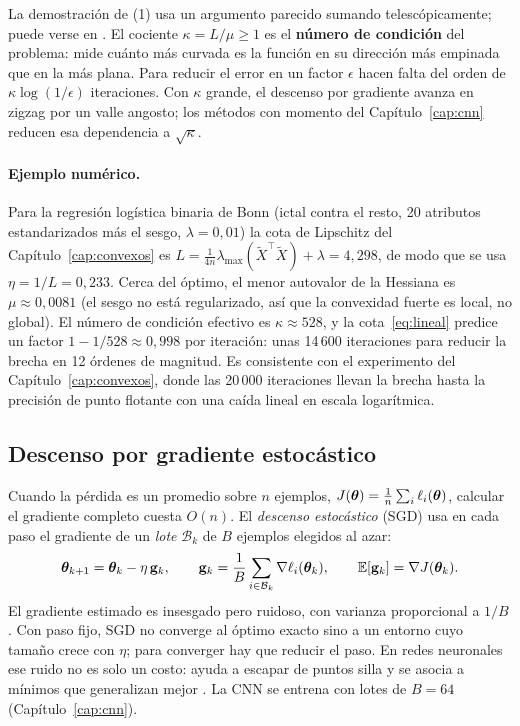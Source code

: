 La demostración de (1) usa un argumento parecido sumando telescópicamente; puede verse en
\textcite[Sec.~9.3]{boyd2004}. El cociente $\kappa = L/\mu \ge 1$ es el \textbf{número de condición} del
problema: mide cuánto más curvada es la función en su dirección más empinada que en la más plana. Para
reducir el error en un factor $\epsilon$ hacen falta del orden de $\kappa\log(1/\epsilon)$ iteraciones. Con
$\kappa$ grande, el descenso por gradiente avanza en zigzag por un valle angosto; los métodos con momento
del Capítulo~\ref{cap:cnn} reducen esa dependencia a $\sqrt\kappa$.

\paragraph{Ejemplo numérico.} Para la regresión logística binaria de Bonn (ictal contra el resto, 20 atributos
estandarizados más el sesgo, $\lambda = 0{,}01$) la cota de Lipschitz del Capítulo~\ref{cap:convexos} es
$L = \tfrac{1}{4n}\lambda_{\max}(\tilde X^\top\tilde X) + \lambda = 4{,}298$, de modo que se usa
$\eta = 1/L = 0{,}233$. Cerca del óptimo, el menor autovalor de la Hessiana es $\mu \approx 0{,}0081$
(el sesgo no está regularizado, así que la convexidad fuerte es local, no global). El número de condición
efectivo es $\kappa \approx 528$, y la cota~\eqref{eq:lineal} predice un factor $1 - 1/528 \approx 0{,}998$
por iteración: unas 14\,600 iteraciones para reducir la brecha en 12 órdenes de magnitud. Es consistente con
el experimento del Capítulo~\ref{cap:convexos}, donde las 20\,000 iteraciones llevan la brecha hasta la
precisión de punto flotante con una caída lineal en escala logarítmica.

\subsection{Descenso por gradiente estocástico}

Cuando la pérdida es un promedio sobre $n$ ejemplos, $J(\boldsymbol{\theta}) = \frac1n\sum_i \ell_i(\boldsymbol{\theta})$, calcular el gradiente
completo cuesta $O(n)$. El \emph{descenso estocástico} (SGD) usa en cada paso el gradiente de un \emph{lote}
$\mathcal{B}_k$ de $B$ ejemplos elegidos al azar:
\begin{equation}
  \boldsymbol{\theta}_{k+1} = \boldsymbol{\theta}_k - \eta\,\mathbf{g}_k, \qquad
  \mathbf{g}_k = \frac{1}{B}\sum_{i \in \mathcal{B}_k}\nabla\ell_i(\boldsymbol{\theta}_k), \qquad \mathbb{E}[\mathbf{g}_k] = \nabla J(\boldsymbol{\theta}_k).
\end{equation}
El gradiente estimado es insesgado pero ruidoso, con varianza proporcional a $1/B$. Con paso fijo, SGD no
converge al óptimo exacto sino a un entorno cuyo tamaño crece con $\eta$; para converger hay que reducir el
paso. En redes neuronales ese ruido no es solo un costo: ayuda a escapar de puntos silla y se asocia a mínimos
que generalizan mejor \parencite{wilson2017}. La CNN se entrena con lotes de $B = 64$
(Capítulo~\ref{cap:cnn}).

